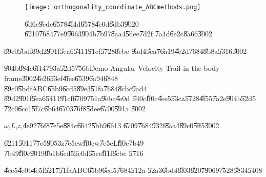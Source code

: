 \begin{figure}[th]
\caption{\U{6d6e}\U{9ede}\U{6578}\U{4f4d}\U{6578}\U{4e0d}\U{8db3}\U{9020}%
\U{6210}\U{7684}\U{77e9}\U{9663}\U{904b}\U{7b97}\U{8aa4}\U{5dee}\U{7d2f}%
\U{7a4d}\U{6e2c}\U{8a66}\U{3002}}
\begin{center}
\texttt{[image: orthogonality\_coordinate\_ABCmethods.png]}
\end{center}
\end{figure}

\clearpage%

\begin{case}
\U{89c0}\U{5bdf}\U{89d2}\U{901f}\U{5ea6}\U{5411}\U{91cf}\U{5728}\U{8cbc}%
\U{9ad4}\U{5ea7}\U{6a19}\U{4e2d}\U{7684}\U{8b8a}\U{5316}\U{3002}
\end{case}

\U{904b}\U{884c}\U{6f14}\U{793a}\U{52d5}\U{756b}Demo-Angular Velocity Trail
in the body frame\U{3002}\U{4e26}\U{53ef}\U{4fee}\U{6539}\U{6a94}\U{6848}%
\U{89c0}\U{5bdf}ABC\U{65b9}\U{6cd5}\U{89e3}\U{51fa}\U{7684}\U{8cbc}\U{9ad4}%
\U{89d2}\U{901f}\U{5ea6}\U{5411}\U{91cf}\U{6709}\U{751a}\U{9ebc}\U{4e0d}%
\U{540c}\U{ff0c}\U{4ee5}\U{53ca}\U{5728}\U{4f55}\U{7a2e}\U{904b}\U{52d5}%
\U{72c0}\U{6cc1}\U{5f7c}\U{6b64}\U{6703}\U{76f8}\U{5dee}\U{6700}\U{591a}%
\U{3002}

\bigskip 

\begin{case}
$\omega $,$L$,$z$,\U{4e92}\U{76f8}\U{7e5e}\U{884c}\U{6642}\U{5bb9}\U{6613}%
\U{6709}\U{7684}\U{932f}\U{8aa4}\U{89c0}\U{5ff5}\U{3002}
\end{case}

\U{6211}\U{5011}\U{77e5}\U{9053}z\U{7e5e}w\U{ff0c}w\U{7e5e}L\U{ff0c}\U{7b49}%
\U{7b49}\U{ff0c}\U{9019}\U{8b1b}\U{6cd5}\U{5c0d}\U{55ce}\U{ff1f}\U{8cbc}%
\U{5716}

\bigskip 

\begin{case}
\U{4ee5}\U{4e0b}\U{4e5f}\U{5217}\U{51fa}ABC\U{65b9}\U{6cd5}\U{7684}\U{512a}%
\U{52a3}\U{6bd4}\U{8f03}\U{8207}\U{9069}\U{7528}\U{5834}\U{5408}
\end{case}

%
\begin{center}

\end{center}%

